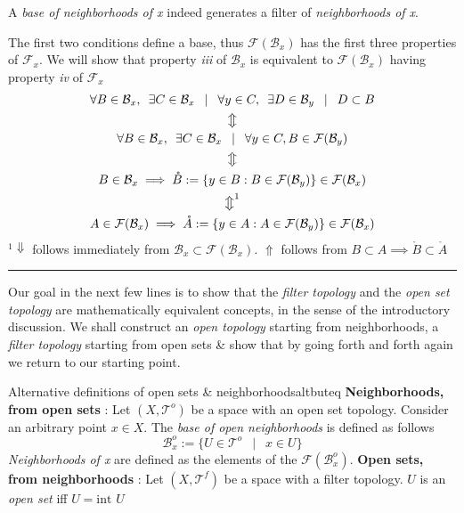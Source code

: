 \begin{mystatement}
	A \textit{base of neighborhoods of x} indeed generates a filter of \textit{neighborhoods of x}. 
\end{mystatement}
\begin{myproof}
	The first two conditions define a base, thus $\mathcal{F}( \mathcal{B}_x )$ has the first three properties of $\mathcal{F}_x$. We will show that property \textit{iii} of $\mathcal{B}_x$ is equivalent to $\mathcal{F}( \mathcal{B}_x )$ having property \textit{iv} of $\mathcal{F}_x$
	\begin{gather*} 
		\forall B \in \mathcal{B}_x, \enspace \exists C \in \mathcal{B}_x \enspace \mid \enspace \forall y\in C, \enspace \exists D \in \mathcal{B}_y \enspace \mid \enspace D \subset B \\
		\big\Updownarrow\\
		\forall B \in \mathcal{B}_x, \enspace \exists C \in \mathcal{B}_x \enspace \mid \enspace \forall y\in C, B \in \mathcal{F}(\mathcal{B}_y)\\
		\big\Updownarrow\\
		B \in \mathcal{B}_x \implies \mathring{B} := \{y \in B : B \in \mathcal{F}( \mathcal{B}_y )\} \in \mathcal{F}( \mathcal{B}_x )\\
		\big\Updownarrow^{1}\\
		A \in 	\mathcal{F}( \mathcal{B}_x) \implies \mathring{A} := \{y \in A : A \in \mathcal{F}( \mathcal{B}_y )\} \in \mathcal{F}( \mathcal{B}_x )
	\end{gather*}
	${}^{1} \Downarrow$ follows immediately from $ \mathcal{B}_x \subset \mathcal{F}( \mathcal{B}_x)$. $\Uparrow$ follows from $B \subset A \implies \mathring{B} \subset \mathring{A}$
\end{myproof}
\noindent \rule[1mm]{\textwidth}{0.4pt}
Our goal in the next few lines is to show that the \textit{filter topology} and the \textit{open set topology} are mathematically equivalent concepts, in the sense of the introductory discussion. We shall construct an \textit{open topology} starting from neighborhoods, a \textit{filter topology} starting from open sets \& show that by going forth and forth again we return to our starting point.
\begin{mydef}{Alternative definitions of open sets \& neighborhoods}{altbuteq}
	\textbf{Neighborhoods, from open sets} : Let $(X, \mathcal{T}^o)$ be a space with an open set topology. Consider an arbitrary point $x\in X$. The \textit{base of open neighborhoods} is defined as follows
	$$\mathcal{B}_x^o := \{U \in \mathcal{T}^o \enspace \mid \enspace x \in U\}$$
	\textit{Neighborhoods of x} are defined as the elements of the $\mathcal{F}( \mathcal{B}_x^o)$.
	\tcblower
	\textbf{Open sets, from neighborhoods} : Let $(X, \mathcal{T}^f)$ be a space with a filter topology. $U$ is an \textit{open set} iff $U = \textrm{int } U$
\end{mydef}
